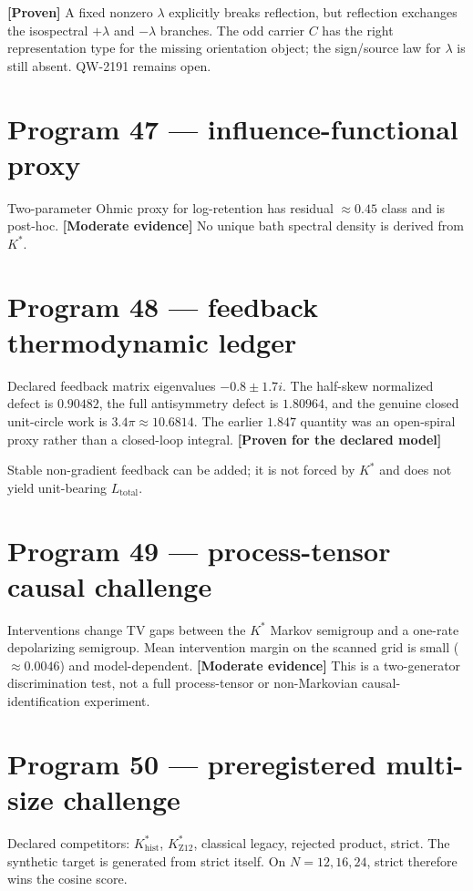 \documentclass[11pt,a4paper,openany]{report}
\newcommand{\statusProven}{\textcolor{fingreen}{[Proven]}}
\newcommand{\statusModerate}{\textcolor{finviolet}{[Moderate evidence]}}
\begin{document}
\textbf{\statusProven{}} A fixed nonzero \(\lambda\) explicitly breaks reflection, but reflection exchanges the isospectral \(+\lambda\) and \(-\lambda\) branches. The odd carrier \(C\) has the right representation type for the missing orientation object; the sign/\allowbreak{}source law for \(\lambda\) is still absent. QW-2191 remains open.

\section{Program 47 — influence-functional proxy}

Two-parameter Ohmic proxy for log-retention has residual \(\approx 0.45\) class and is post-hoc. \textbf{\statusModerate{}} No unique bath spectral density is derived from \(K^*\).

\section{Program 48 — feedback thermodynamic ledger}

Declared feedback matrix eigenvalues \(-0.8\pm 1.7i\). The half-skew normalized defect is \(0.90482\), the full antisymmetry defect is \(1.80964\), and the genuine closed unit-circle work is \(3.4\pi\approx10.6814\). The earlier \(1.847\) quantity was an open-spiral proxy rather than a closed-loop integral. \textbf{[Proven for the declared model]}

Stable non-gradient feedback can be added; it is not forced by \(K^*\) and does not yield unit-bearing \(L_{\mathrm{total}}\).

\section{Program 49 — process-tensor causal challenge}

Interventions change TV gaps between the \(K^*\) Markov semigroup and a one-rate depolarizing semigroup. Mean intervention margin on the scanned grid is small (\(\approx 0.0046\)) and model-dependent. \textbf{\statusModerate{}} This is a two-generator discrimination test, not a full process-tensor or non-Markovian causal-identification experiment.

\section{Program 50 — preregistered multi-size challenge}

Declared competitors: \(K^*_{\mathrm{hist}}\), \(K^*_{\mathrm{Z12}}\), classical legacy, rejected product, strict. The synthetic target is generated from strict itself. On \(N=12,16,24\), strict therefore wins the cosine score.
\end{document}
